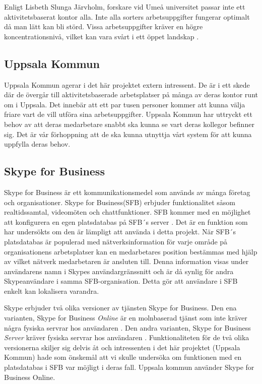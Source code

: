 \documentclass[swedish, a4paper,12pt]{article}
\begin{document}
Enligt Lisbeth Slunga Järvholm, forskare vid Umeå universitet passar inte ett aktivitetsbaserat kontor alla. Inte alla sorters arbetsuppgifter fungerar optimalt då man lätt kan bli störd. Vissa arbetsuppgifter kräver en högre koncentrationsnivå, vilket kan vara svårt i ett öppet landskap \cite{passarInteAlla}.

\subsection{Uppsala Kommun}
Uppsala Kommun agerar i det här projektet extern intressent. De är i ett skede där de övergår till aktivitetsbaserade arbetsplatser på många av deras kontor runt om i Uppsala. Det innebär att %
ett par tusen personer kommer att kunna välja friare vart de vill utföra sina arbetsuppgifter. Uppsala Kommun har uttryckt ett behov av att deras medarbetare snabbt ska kunna se vart deras kollegor befinner sig. Det är vår förhoppning att de ska kunna utnyttja vårt system för att kunna uppfylla deras behov.

\subsection{Skype for Business}
Skype for Business är ett kommunikationsmedel som används av många företag och organisationer. Skype for Business(SFB) erbjuder funktionalitet såsom realtidssamtal, videomöten och chattfunktioner. SFB kommer med en möjlighet att konfigurera en egen platsdatabas på SFB´s server \cite{Microsoft-Office}. Det är en funktion som har undersökts om den är lämpligt att använda i detta projekt. När SFB´s platsdatabas är populerad med nätverksinformation för varje område på organisationens arbetsplatser kan en medarbetares position bestämmas med hjälp av vilket nätverk medarbetaren är ansluten till. Denna information visas under användarens namn i Skypes användargränssnitt och är då synlig för andra Skypeanvändare i samma SFB-organisation. Detta gör att användare i SFB enkelt kan lokalisera varandra.

Skype erbjuder två olika versioner av tjänsten Skype for Business. Den ena varianten, Skype for Business \textit{Online} är en molnbaserad tjänst som inte kräver några fysiska servrar hos användaren \cite{SFBonline}.
Den andra varianten, Skype for Business \textit{Server} kräver fysiska servrar hos användaren \cite{SFBserver}. Funktionaliteten för de två olika versionerna skiljer sig delvis åt och intressenten i det här projektet (Uppsala Kommun) hade som önskemål att vi skulle undersöka om funktionen med en platsdatabas i SFB var möjligt i deras fall. Uppsala kommun använder Skype for Business Online.
\end{document}
